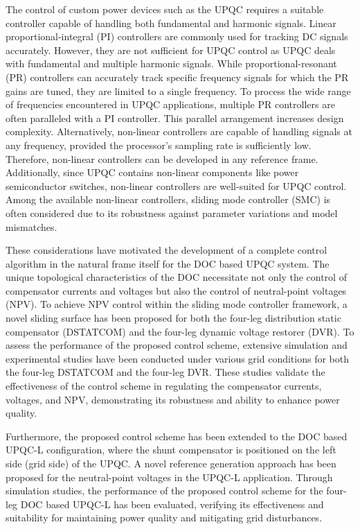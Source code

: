 The control of custom power devices such as the UPQC requires a suitable controller capable of handling both fundamental and harmonic signals. Linear proportional-integral (PI) controllers are commonly used for tracking DC signals accurately. However, they are not sufficient for UPQC control as UPQC deals with fundamental and multiple harmonic signals. While proportional-resonant (PR) controllers can accurately track specific frequency signals for which the PR gains are tuned, they are limited to a single frequency. To process the wide range of frequencies encountered in UPQC applications, multiple PR controllers are often paralleled with a PI controller. This parallel arrangement increases design complexity. Alternatively, non-linear controllers are capable of handling signals at any frequency, provided the processor's sampling rate is sufficiently low. Therefore, non-linear controllers can be developed in any reference frame. Additionally, since UPQC contains non-linear components like power semiconductor switches, non-linear controllers are well-suited for UPQC control. Among the available non-linear controllers, sliding mode controller (SMC) is often considered due to its robustness against parameter variations and model mismatches.

These considerations have motivated the development of a complete control algorithm in the natural frame itself for the DOC based UPQC system. The unique topological characteristics of the DOC necessitate not only the control of compensator currents and voltages but also the control of neutral-point voltages (NPV). To achieve NPV control within the sliding mode controller framework, a novel sliding surface has been proposed for both the four-leg distribution static compensator (DSTATCOM) and the four-leg dynamic voltage restorer (DVR). To assess the performance of the proposed control scheme, extensive simulation and experimental studies have been conducted under various grid conditions for both the four-leg DSTATCOM and the four-leg DVR. These studies validate the effectiveness of the control scheme in regulating the compensator currents, voltages, and NPV, demonstrating its robustness and ability to enhance power quality.

Furthermore, the proposed control scheme has been extended to the DOC based UPQC-L configuration, where the shunt compensator is positioned on the left side (grid side) of the UPQC. A novel reference generation approach has been proposed for the neutral-point voltages in the UPQC-L application. Through simulation studies, the performance of the proposed control scheme for the four-leg DOC based UPQC-L has been evaluated, verifying its effectiveness and suitability for maintaining power quality and mitigating grid disturbances.

